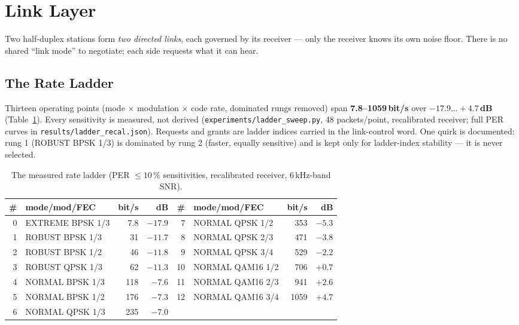 \section{Link Layer}
\label{sec:link}

Two half-duplex stations form \emph{two directed links}, each governed
by its receiver --- only the receiver knows its own noise floor.  There
is no shared ``link mode'' to negotiate; each side requests what it can
hear.

\subsection{The Rate Ladder}

Thirteen operating points (mode $\times$ modulation $\times$ code
rate, dominated rungs removed) span \textbf{7.8--1059\,bit/s} over
\textbf{$-17.9\ldots+4.7$\,dB} (Table~\ref{tab:ladder}).  Every
sensitivity is measured, not derived
(\texttt{experiments/ladder\_sweep.py}, 48 packets/point, recalibrated
receiver; full PER curves in \texttt{results/ladder\_recal.json}).
Requests and grants are ladder indices carried in the link-control
word.  One quirk is documented: rung 1 (ROBUST BPSK 1/3) is dominated
by rung 2 (faster, equally sensitive) and is kept only for
ladder-index stability --- it is never selected.

\begin{table}[H]
    \centering
    \caption{The measured rate ladder (PER $\le 10\,\%$ sensitivities,
             recalibrated receiver, 6\,kHz-band SNR).}
    \label{tab:ladder}
    \small
    \begin{tabular}{@{}rlrr@{\hspace{2em}}rlrr@{}}
    \toprule
    \# & \textbf{mode/mod/FEC} & \textbf{bit/s} & \textbf{dB} &
    \# & \textbf{mode/mod/FEC} & \textbf{bit/s} & \textbf{dB} \\
    \midrule
    0 & EXTREME BPSK 1/3 & 7.8 & $-17.9$ & 7  & NORMAL QPSK 1/2  & 353  & $-5.3$ \\
    1 & ROBUST BPSK 1/3  & 31  & $-11.7$ & 8  & NORMAL QPSK 2/3  & 471  & $-3.8$ \\
    2 & ROBUST BPSK 1/2  & 46  & $-11.8$ & 9  & NORMAL QPSK 3/4  & 529  & $-2.2$ \\
    3 & ROBUST QPSK 1/3  & 62  & $-11.3$ & 10 & NORMAL QAM16 1/2 & 706  & $+0.7$ \\
    4 & NORMAL BPSK 1/3  & 118 & $-7.6$  & 11 & NORMAL QAM16 2/3 & 941  & $+2.6$ \\
    5 & NORMAL BPSK 1/2  & 176 & $-7.3$  & 12 & NORMAL QAM16 3/4 & 1059 & $+4.7$ \\
    6 & NORMAL QPSK 1/3  & 235 & $-7.0$  &    &                  &      &         \\
    \bottomrule
    \end{tabular}
\end{table}

